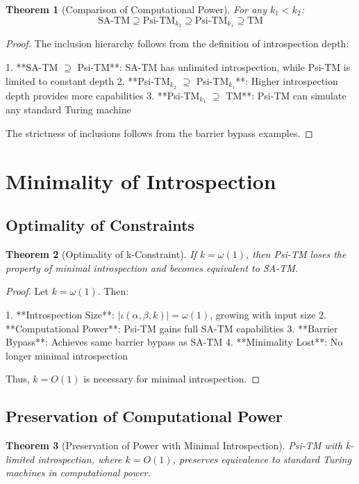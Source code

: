 \documentclass[11pt]{article}
\newtheorem{theorem}{Theorem}
\begin{document}
\begin{theorem}[Comparison of Computational Power]
For any $k_1 < k_2$:
$$\text{SA-TM} \supseteq \text{Psi-TM}_{k_2} \supseteq \text{Psi-TM}_{k_1} \supseteq \text{TM}$$
\end{theorem}

\begin{proof}
The inclusion hierarchy follows from the definition of introspection depth:

1. **SA-TM $\supseteq$ Psi-TM**: SA-TM has unlimited introspection, while Psi-TM is limited to constant depth
2. **Psi-TM$_{k_2}$ $\supseteq$ Psi-TM$_{k_1}$**: Higher introspection depth provides more capabilities
3. **Psi-TM$_{k_1}$ $\supseteq$ TM**: Psi-TM can simulate any standard Turing machine

The strictness of inclusions follows from the barrier bypass examples.
\end{proof}

\section{Minimality of Introspection}

\subsection{Optimality of Constraints}

\begin{theorem}[Optimality of k-Constraint]
If $k = \omega(1)$, then Psi-TM loses the property of minimal introspection and becomes equivalent to SA-TM.
\end{theorem}

\begin{proof}
Let $k = \omega(1)$. Then:

1. **Introspection Size**: $|\iota(\alpha, \beta, k)| = \omega(1)$, growing with input size
2. **Computational Power**: Psi-TM gains full SA-TM capabilities
3. **Barrier Bypass**: Achieves same barrier bypass as SA-TM
4. **Minimality Lost**: No longer minimal introspection

Thus, $k = O(1)$ is necessary for minimal introspection.
\end{proof}

\subsection{Preservation of Computational Power}

\begin{theorem}[Preservation of Power with Minimal Introspection]
Psi-TM with k-limited introspection, where $k = O(1)$, preserves equivalence to standard Turing machines in computational power.
\end{theorem}
\end{document}

